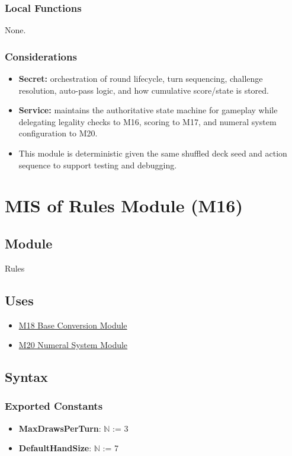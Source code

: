 \documentclass[12pt, titlepage]{article}
\begin{document}
\subsubsection{Local Functions}
None.

\subsubsection{Considerations}
\begin{itemize}
    \item \textbf{Secret:} orchestration of round lifecycle, turn sequencing, challenge resolution, auto-pass logic, and how cumulative score/state is stored.
    \item \textbf{Service:} maintains the authoritative state machine for gameplay while delegating legality checks to M16, scoring to M17, and numeral system configuration to M20.
    \item This module is deterministic given the same shuffled deck seed and action sequence to support testing and debugging.
\end{itemize}


\newpage
\section{MIS of Rules Module (M16)}\label{sec:rules-module}

\subsection{Module}
Rules

\subsection{Uses}
\begin{itemize}
    \item \hyperref[sec:base-conversion-module]{M18 Base Conversion Module}
    \item \hyperref[sec:numeral-system-module]{M20 Numeral System Module}
\end{itemize}

\subsection{Syntax}

\subsubsection{Exported Constants}
\begin{itemize}
    \item \textbf{MaxDrawsPerTurn}: $\mathbb{N}$ := 3
    \item \textbf{DefaultHandSize}: $\mathbb{N}$ := 7
\end{itemize}
\end{document}
